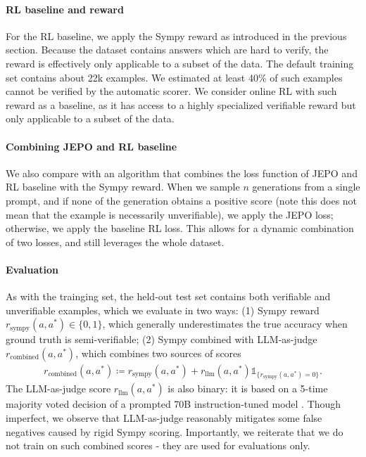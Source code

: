 \documentclass{article}
\theoremstyle{definition}
\begin{document}
\paragraph{RL baseline and reward} For the RL baseline, we apply the Sympy reward as introduced in the previous section. Because the dataset contains answers which are hard to verify, the reward is effectively only applicable to a subset of the data. The default training set contains about 22k examples. We estimated at least 40\% of such examples cannot be verified by the automatic scorer. We consider online RL with such reward as a baseline, as it has access to a highly specialized verifiable reward but only applicable to a subset of the data.

\paragraph{Combining JEPO and RL baseline} We also compare with an algorithm that combines the loss function of JEPO and RL baseline with the Sympy reward. When we sample $n$ generations from a single prompt, and if none of the generation obtains a positive score (note this does not mean that the example is necessarily unverifiable), we apply the JEPO loss; otherwise, we apply the baseline RL loss. This allows for a dynamic combination of two losses, and still leverages the whole dataset.


\paragraph{Evaluation} As with the trainging set, the held-out test set contains both verifiable and unverifiable examples, which we evaluate in two ways: (1) Sympy reward $r_\text{sympy}(a,a^*)\in\{0,1\}$, which generally underestimates the true accuracy when ground truth is semi-verifiable; (2) Sympy combined with LLM-as-judge $r_\text{combined}(a,a^*)$, which combines two sources of scores 
\begin{align*}
    r_\text{combined}(a,a^*) \coloneqq r_\text{sympy}(a,a^*) + r_\text{llm}(a,a^*)\mathds{1}_{\{r_\text{sympy}(a,a^*)=0\}}.
\end{align*}
The LLM-as-judge score $r_\text{llm}(a,a^*)$ is also binary: it is based on a 5-time majority voted decision of a prompted 70B instruction-tuned model \citep{dubey2024llama}. Though imperfect, we observe that LLM-as-judge reasonably mitigates some false negatives caused by rigid Sympy scoring.
Importantly, we reiterate that we do not train on such combined scores - they are used for evaluations only.
\end{document}
